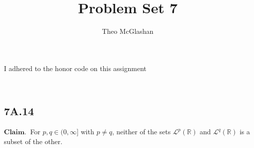 \documentclass[12pt]{article}
\title{Problem Set 7}
\author{Theo McGlashan}
\date{}
\newcommand{\R}{\mathbb{R}}
\begin{document}
\maketitle

\begin{center}
    I adhered to the honor code on this assignment
\end{center}

\newpage
\
\newpage

\subsection*{7A.14}

$\mathbf{Claim.}~$ For $p, q \in (0, \infty]$ with $p \neq q$, neither of the sets $\mathcal{L}^p(\R)$ and $\mathcal{L}^q(\R)$ is a subset of the other.
\end{document}
